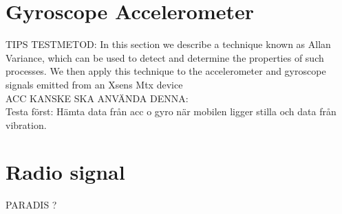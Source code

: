 \section{Gyroscope Accelerometer}\label{sec:test:gyro}
TIPS TESTMETOD: In this section we describe a technique known as Allan Variance, which can be used to detect and determine the properties of such processes. We then apply this technique to the accelerometer and gyroscope signals emitted from an Xsens Mtx device \cite{sensor:inertialNav} \\
ACC KANSKE SKA ANVÄNDA DENNA: \cite{sensor:micSpek} \\

Testa först:
Hämta data från acc o gyro när mobilen ligger stilla och data från vibration.

\section{Radio signal}\label{sec:test:rff}
PARADIS ?
